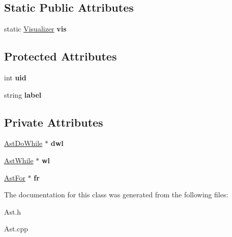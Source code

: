\subsection*{Static Public Attributes}
\begin{DoxyCompactItemize}
\item 
\hypertarget{classAST_aca9e6637209b31e03a09c0d42f29bdfa}{static \hyperlink{classVisualizer}{Visualizer} {\bfseries vis}}\label{classAST_aca9e6637209b31e03a09c0d42f29bdfa}

\end{DoxyCompactItemize}
\subsection*{Protected Attributes}
\begin{DoxyCompactItemize}
\item 
\hypertarget{classAST_a847b778f1c3dd5a19de32de432ee6e15}{int {\bfseries uid}}\label{classAST_a847b778f1c3dd5a19de32de432ee6e15}

\item 
\hypertarget{classAST_ab2e239ccc0688d2341724432ff5a1a31}{string {\bfseries label}}\label{classAST_ab2e239ccc0688d2341724432ff5a1a31}

\end{DoxyCompactItemize}
\subsection*{Private Attributes}
\begin{DoxyCompactItemize}
\item 
\hypertarget{classAstIteration_ac984b15a824002ce1825c942271a3020}{\hyperlink{classAstDoWhile}{Ast\-Do\-While} $\ast$ {\bfseries dwl}}\label{classAstIteration_ac984b15a824002ce1825c942271a3020}

\item 
\hypertarget{classAstIteration_aedd1375432ddac3f75b7abe71d7ba34a}{\hyperlink{classAstWhile}{Ast\-While} $\ast$ {\bfseries wl}}\label{classAstIteration_aedd1375432ddac3f75b7abe71d7ba34a}

\item 
\hypertarget{classAstIteration_a166639cd7bfababcd469b182d76be91f}{\hyperlink{classAstFor}{Ast\-For} $\ast$ {\bfseries fr}}\label{classAstIteration_a166639cd7bfababcd469b182d76be91f}

\end{DoxyCompactItemize}


The documentation for this class was generated from the following files\-:\begin{DoxyCompactItemize}
\item 
Ast.\-h\item 
Ast.\-cpp\end{DoxyCompactItemize}
